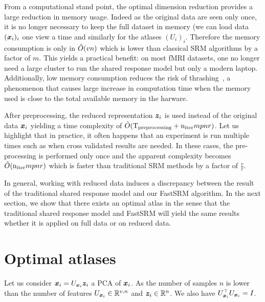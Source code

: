 From a computational stand point, the optimal dimension reduction provides
a large reduction in memory usage. Indeed as the original data are seen only
once, it is no longer necessary to keep the full dataset in memory (we can load
data $(\boldsymbol{x}_i)_i$ one view a time and similarly for the atlases $(U_i)_i$. Therefore the memory consumption is only in $\tilde{O}(vn)$ which is lower than classical SRM algorithms by a factor of $m$. This yields a practical benefit: on most fMRI datasets, one no longer need a large cluster to run the shared response model but only a modern laptop.
Additionally, low memory consumption reduces the
risk of thrashing~\cite{denning1968thrashing}, a phenomenon that causes large
increase in computation time when the memory used is close to the total available
memory in the harware.

After preprocessing, the reduced representation $\boldsymbol{z}_i$ is used instead of the
original data $\boldsymbol{x}_i$ yielding a time complexity of $\tilde{O}(
\mathrm{T_{preprocessing}} + \mathrm{n_{iter}} mpnr)$.
Let us highlight that in practice, it often happens that an experiment is run
multiple times such as when cross validated results are needed. In these cases,
the pre-processing is performed only once and the apparent complexity becomes
$\tilde{O}(\mathrm{n_{iter}} mpnr)$ which is faster than traditional SRM methods by
a factor of $\frac{v}{r}$.

In general, working with reduced data induces a discrepancy between the result
of the traditional shared response model  and our FastSRM algorithm.
In the next section, we show that there exists an optimal atlas in the sense
that the traditional shared response model and FastSRM will yield the same
results whether it is applied on full data or on reduced data.

\section{Optimal atlases}
Let us consider $\boldsymbol{x}_i = U_{\boldsymbol{x}_i} \boldsymbol{z}_i$ a PCA of $\boldsymbol{x}_i$. As the number of
samples $n$ is lower than the number of features $U_{\boldsymbol{x}_i} \in \mathbb{R}^{v, n}$ and
$\boldsymbol{z}_i \in \mathbb{R}^{n}$.  We also have $U_{\boldsymbol{x}_i}^{\top}U_{\boldsymbol{x}_i} = I$.

